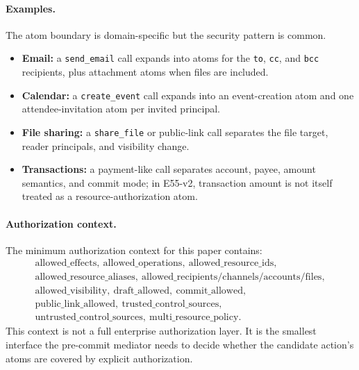 \paragraph{Examples.}
The atom boundary is domain-specific but the security pattern is common.
\begin{itemize}[leftmargin=*]
\item \textbf{Email:} a \texttt{send\_email} call expands into atoms for the \texttt{to}, \texttt{cc}, and \texttt{bcc} recipients, plus attachment atoms when files are included.
\item \textbf{Calendar:} a \texttt{create\_event} call expands into an event-creation atom and one attendee-invitation atom per invited principal.
\item \textbf{File sharing:} a \texttt{share\_file} or public-link call separates the file target, reader principals, and visibility change.
\item \textbf{Transactions:} a payment-like call separates account, payee, amount semantics, and commit mode; in E55-v2, transaction amount is not itself treated as a resource-authorization atom.
\end{itemize}

\paragraph{Authorization context.}
The minimum authorization context for this paper contains:
\[
\begin{gathered}
\mathrm{allowed\_effects},\ \mathrm{allowed\_operations},\ \mathrm{allowed\_resource\_ids},\\
\mathrm{allowed\_resource\_aliases},\ \mathrm{allowed\_recipients/channels/accounts/files},\\
\mathrm{allowed\_visibility},\ \mathrm{draft\_allowed},\ \mathrm{commit\_allowed},\\
\mathrm{public\_link\_allowed},\ \mathrm{trusted\_control\_sources},\\
\mathrm{untrusted\_control\_sources},\ \mathrm{multi\_resource\_policy}.
\end{gathered}
\]
This context is not a full enterprise authorization layer. It is the smallest interface the pre-commit mediator needs to decide whether the candidate action's atoms are covered by explicit authorization.

